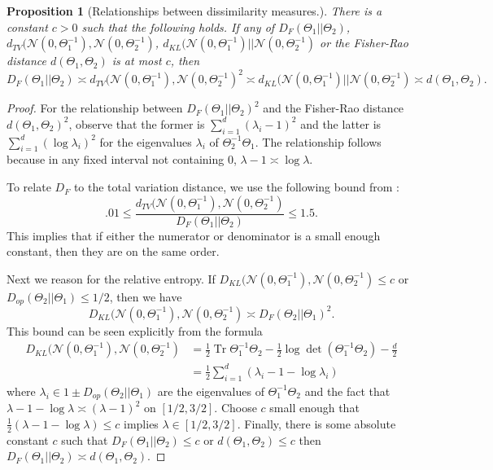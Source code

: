 \documentclass[aos]{imsart}
\newtheorem{prop}[theorem]{Proposition}
\theoremstyle{definition}
\numberwithin{equation}{section}
\DeclareMathOperator{\tr}{Tr}
\begin{document}
\begin{appendix}
\begin{prop}[Relationships between dissimilarity measures.] There is a constant $c > 0$ such that the following holds. If any of $D_F(\Theta_1|| \Theta_2)$, $d_{TV}(\mathcal{N}(0, \Theta_1^{-1}), \mathcal{N}(0, \Theta_2^{-1})$, $d_{KL}(\mathcal{N}(0, \Theta_1^{-1}) || \mathcal{N}(0, \Theta_2^{-1})$ or the Fisher-Rao distance $d(\Theta_1, \Theta_2)$ is at most $c$, then 
$$ D_F(\Theta_1|| \Theta_2) \asymp  d_{TV}(\mathcal{N}(0, \Theta_1^{-1}), \mathcal{N}(0, \Theta_2^{-1})^2 \asymp d_{KL}(\mathcal{N}(0, \Theta_1^{-1}) || \mathcal{N}(0, \Theta_2^{-1}) \asymp d(\Theta_1, \Theta_2).$$
\end{prop}
\begin{proof}
For the relationship between $D_F(\Theta_1|| \Theta_2)^2$ and the Fisher-Rao distance $d(\Theta_1, \Theta_2)^2$, observe that the former is $\sum_{i = 1}^d (\lambda_i - 1)^2$ and the latter is $\sum_{i = 1}^d (\log \lambda_i)^2$ for the eigenvalues $\lambda_i$ of $\Theta_2^{-1} \Theta_1$. The relationship follows because in any fixed interval not containing $0$, $\lambda-1 \asymp \log \lambda$.

To relate $D_F$ to the total variation distance, we use the following bound from \cite{devroye2018total}:
$$.01  \leq \frac{d_{TV}(\mathcal{N}(0, \Theta_1^{-1}), \mathcal{N}(0, \Theta_2^{-1})}{D_F(\Theta_1 || \Theta_2)} \leq 1.5.$$ 
This implies that if either the numerator or denominator is a small enough constant, then they are on the same order. 

Next we reason for the relative entropy. If $D_{KL}(\mathcal{N}(0, \Theta_1^{-1}), \mathcal{N}(0, \Theta_2^{-1}) \leq c$ or $D_{op}(\Theta_2 || \Theta_1) \leq 1/2$, then we have 
$$D_{KL}(\mathcal{N}(0, \Theta_1^{-1}), \mathcal{N}(0, \Theta_2^{-1})  \asymp D_{F}(\Theta_2 || \Theta_1)^2.$$ This bound can be seen explicitly from the formula 
\begin{align*}D_{KL}(\mathcal{N}(0, \Theta_1^{-1}), \mathcal{N}(0, \Theta_2^{-1}) &= \frac{1}{2} \tr \Theta_1^{-1} \Theta_2 - \frac{1}{2}\log\det(\Theta_1^{-1} \Theta_2) - \frac{d}{2}\\
& = \frac{1}{2} \sum_{i =1}^d (\lambda_i -1 -  \log \lambda_i)
\end{align*}
 where $\lambda_i \in 1 \pm D_{op}(\Theta_2||\Theta_1)$ are the eigenvalues of $\Theta_1^{-1} \Theta_2$ and the fact that $\lambda - 1 -\log\lambda \asymp  (\lambda - 1)^2$ on $[1/2, 3/2]$. Choose $c$ small enough that $\frac{1}{2}(\lambda - 1 -\log\lambda) \leq c $ implies $\lambda \in [1/2, 3/2]$. Finally, there is some absolute constant $c$ such that $D_F(\Theta_1 || \Theta_2) \leq c$ or $d(\Theta_1, \Theta_2) \leq c$ then $D_F(\Theta_1 || \Theta_2) \asymp d(\Theta_1, \Theta_2)$.\end{proof}
\end{appendix}
\end{document}
